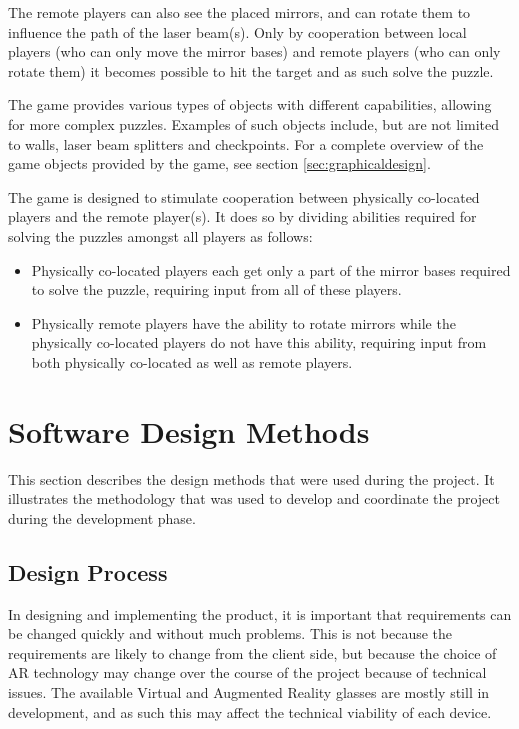 		The remote players can also see the placed mirrors, and can rotate them
		to influence the path of the laser beam(s). Only by cooperation between
		local players (who can only move the mirror bases) and remote players
		(who can only rotate them) it becomes possible to hit the target and as
		such solve the puzzle.
		
		The game provides various types of objects with different capabilities, 
		allowing for more complex puzzles. Examples of such objects include,
		but are not limited to walls, laser beam splitters and checkpoints.
		For a complete overview of the game objects provided by the game, see
		section \ref{sec:graphicaldesign}.
		
		The game is designed to stimulate cooperation between physically
		co-located players and the remote player(s). It does so by
		dividing abilities required for solving the puzzles amongst all players
		as follows:
		
		\begin{itemize}
			\item Physically co-located players each get only a part of the
			mirror bases required to solve the puzzle, requiring input
			from all of these players.
			\item Physically remote players have the ability to rotate
			mirrors while the physically co-located players do not have
			this ability, requiring input from both physically co-located
			as well as remote players.
		\end{itemize}
	
	\section{Software Design Methods} \label{sec:designmethods}
		This section describes the design methods that were used during the
		project. It illustrates the methodology that was used to develop and
		coordinate the project during the development phase.
	
		\subsection{Design Process} \label{ssec:designprocess}
			In designing and implementing the product, it is important that
			requirements can be changed quickly and without much problems. This is
			not because the requirements are likely to change from the client
			side, but because the choice of AR technology may change over the
			course of the project because of technical issues. The available Virtual
			and Augmented Reality glasses are mostly still in development, and as
			such this may affect the technical viability of each device.
			
